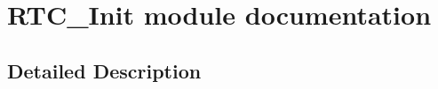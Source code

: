 \hypertarget{group___r_t_c___init__module}{}\section{R\+T\+C\+\_\+\+Init module documentation}
\label{group___r_t_c___init__module}


\subsection{Detailed Description}
